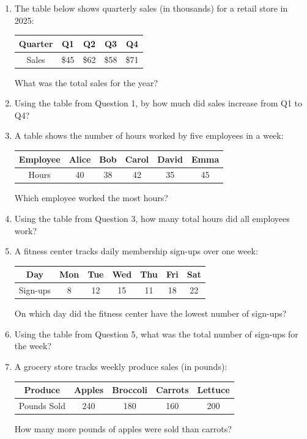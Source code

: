 \documentclass[12pt,a4paper]{article}
\begin{document}
\begin{enumerate}

\item The table below shows quarterly sales (in thousands) for a retail store in 2025:
\begin{center}
\begin{tabular}{|c|c|c|c|c|}
\hline
Quarter & Q1 & Q2 & Q3 & Q4 \\
\hline
Sales & \$45 & \$62 & \$58 & \$71 \\
\hline
\end{tabular}
\end{center}
What was the total sales for the year?

\item Using the table from Question 1, by how much did sales increase from Q1 to Q4?

\item A table shows the number of hours worked by five employees in a week:
\begin{center}
\begin{tabular}{|c|c|c|c|c|c|}
\hline
Employee & Alice & Bob & Carol & David & Emma \\
\hline
Hours & 40 & 38 & 42 & 35 & 45 \\
\hline
\end{tabular}
\end{center}
Which employee worked the most hours?

\item Using the table from Question 3, how many total hours did all employees work?

\item A fitness center tracks daily membership sign-ups over one week:
\begin{center}
\begin{tabular}{|c|c|c|c|c|c|c|}
\hline
Day & Mon & Tue & Wed & Thu & Fri & Sat \\
\hline
Sign-ups & 8 & 12 & 15 & 11 & 18 & 22 \\
\hline
\end{tabular}
\end{center}
On which day did the fitness center have the lowest number of sign-ups?

\item Using the table from Question 5, what was the total number of sign-ups for the week?

\item A grocery store tracks weekly produce sales (in pounds):
\begin{center}
\begin{tabular}{|c|c|c|c|c|}
\hline
Produce & Apples & Broccoli & Carrots & Lettuce \\
\hline
Pounds Sold & 240 & 180 & 160 & 200 \\
\hline
\end{tabular}
\end{center}
How many more pounds of apples were sold than carrots?


\end{enumerate}
\end{document}

